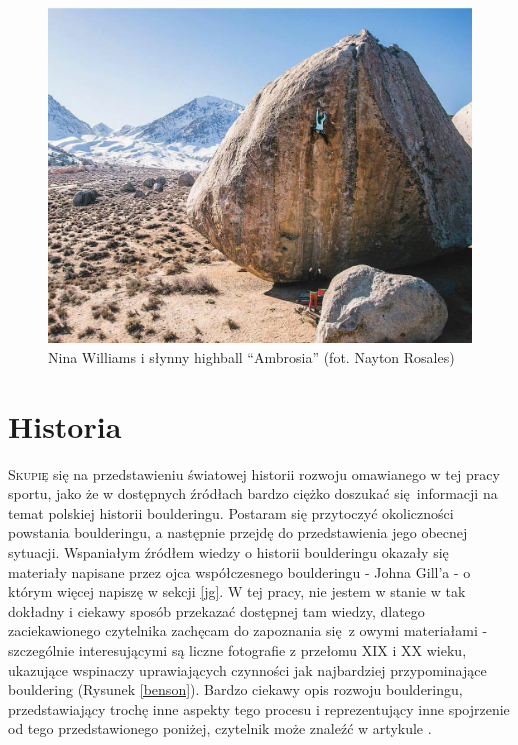 \documentclass{article}
\begin{document}
\begin{figure}[!htbp]
	\begin{center}
		\includegraphics[width=0.7\linewidth]{images/nina-williams-abrosia.eps}
	\end{center}
	\caption{Nina Williams i słynny highball “Ambrosia” (fot. Nayton Rosales) \cite{nina}}
	\label{ambrosia}
\end{figure}

\section{Historia}
\lettrine[lines=2]{S}{kupię} się na przedstawieniu światowej historii rozwoju omawianego w tej pracy sportu, jako że w dostępnych źródłach bardzo ciężko doszukać się informacji na temat polskiej historii boulderingu. Postaram się przytoczyć okoliczności powstania boulderingu, a następnie przejdę do przedstawienia jego obecnej sytuacji. Wspaniałym źródłem wiedzy o historii boulderingu okazały się materiały \cite{gill-history} napisane przez ojca współczesnego boulderingu - Johna Gill'a - o którym więcej napiszę w sekcji \ref{jg}. W tej pracy, nie jestem w stanie w tak dokładny i ciekawy sposób przekazać dostępnej tam wiedzy, dlatego zaciekawionego czytelnika zachęcam do zapoznania się z owymi materiałami - szczególnie interesującymi są liczne fotografie z przełomu XIX i XX wieku, ukazujące wspinaczy uprawiających czynności jak najbardziej przypominające bouldering (Rysunek \ref{benson}). Bardzo ciekawy opis rozwoju boulderingu, przedstawiający trochę inne aspekty tego procesu i reprezentujący inne spojrzenie od tego przedstawionego poniżej, czytelnik może znaleźć w artykule \cite{pg-hist}.
\end{document}
